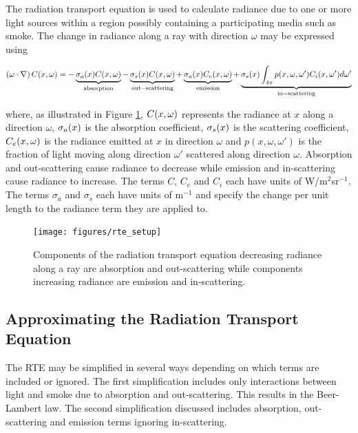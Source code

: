 The radiation transport equation is used to calculate radiance due to one or more light sources within a region possibly containing a participating media such as smoke. The change in radiance along a ray with direction $\omega$ may be expressed using

\begin{eqnarray}
\label{eq:fullrte}
 \left(\omega\cdot\nabla\right)C(x,\omega) =
-\underbrace{\sigma_a(x)C(x,\omega)}_\mathrm{absorption}-\underbrace{\sigma_s(x)C(x,\omega)}_\mathrm{out-scattering}
+ \underbrace{\sigma_a(x)C_e(x,\omega)}_\mathrm{emission} +
\underbrace{\sigma_s(x)\int_{4\pi}p(x,\omega,\omega')C_i(x,\omega')d\omega'}_\mathrm{in-scattering}
\end{eqnarray}

\noindent where, as illustrated in Figure \ref{figRadiance}, $C(x,\omega)$ represents the  radiance at $x$ along a direction $\omega$, $\sigma_a(x)$ is the absorption coefficient, $\sigma_s(x)$ is the scattering coefficient, $C_e(x,\omega)$ is the radiance emitted at $x$ in direction $\omega$ and $p(x,\omega,\omega')$ is the fraction of light moving along direction $\omega'$ scattered along direction $\omega$. Absorption and out-scattering cause radiance to decrease while emission and in-scattering cause radiance to increase. The terms $C$, $C_e$ and $C_i$ each have units of W/m$^2$sr$^{-1}$.  The terms $\sigma_a$ and $\sigma_s$ each have units of m$^{-1}$ and specify the change per unit length to the radiance term they are applied to.

\begin{figure}[\figoptions]
\begin{center}
\texttt{[image: figures/rte\_setup]}
\end{center}
\caption{Components of the radiation transport equation decreasing radiance along a ray are
absorption and out-scattering while components increasing radiance are emission and in-scattering.}
\label{figRadiance}
\end{figure}

%
%

\subsection{Approximating the Radiation Transport Equation}

The RTE may be simplified in several ways depending on which terms are included or ignored.  The first simplification includes only interactions between light and smoke due to absorption and out-scattering. This results in the Beer-Lambert law.  The second simplification discussed includes absorption, out-scattering and emission terms ignoring in-scattering.


